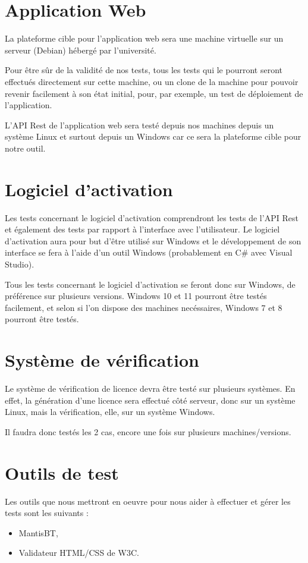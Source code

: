 \section{Application Web}
La plateforme cible pour l'application web sera une machine virtuelle sur un serveur (Debian)
hébergé par l'université.

Pour être sûr de la validité de nos tests, tous les tests qui le pourront seront effectués
directement sur cette machine, ou un clone de la machine pour pouvoir revenir facilement à son
état initial, pour, par exemple, un test de déploiement de l'application.

L'API Rest de l'application web sera testé depuis nos machines depuis un système Linux et surtout
depuis un Windows car ce sera la plateforme cible pour notre outil.

\section{Logiciel d'activation}
Les tests concernant le logiciel d'activation comprendront les tests de l'API Rest et également
des tests par rapport à l'interface avec l'utilisateur. Le logiciel d'activation aura pour but
d'être utilisé sur Windows et le développement de son interface se fera à l'aide d'un outil Windows
(probablement en C\# avec Visual Studio).

Tous les tests concernant le logiciel d'activation se
feront donc sur Windows, de préférence sur plusieurs versions. Windows 10 et 11 pourront être
testés facilement, et selon si l'on dispose des machines necéssaires, Windows 7 et 8 pourront être
testés.

\section{Système de vérification}
Le système de vérification de licence devra être testé sur plusieurs systèmes. En effet, la
génération d'une licence sera effectué côté serveur, donc sur un système Linux, mais la
vérification, elle, sur un système Windows.

Il faudra donc testés les 2 cas, encore une fois sur plusieurs machines/versions.

\section{Outils de test}
Les outils que nous mettront en oeuvre pour nous aider à effectuer et gérer les tests sont les
suivants :
\begin{itemize}
    \item MantisBT,
    \item Validateur HTML/CSS de W3C.
\end{itemize}

